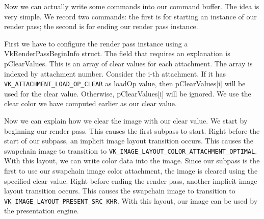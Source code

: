 \begin{minipage}{\linewidth}{\noindent}
    
\end{minipage}

Now we can actually write some commands into our command buffer.
The idea is very simple.
We record two commands: the first is for starting an instance of our render pass;
the second is for ending our render pass instance.

\begin{minipage}{\linewidth}{\noindent}
    
\end{minipage}

First we have to configure the render pass instance using a VkRenderPassBeginInfo
struct.
The field that requires an explanation is pClearValues.
This is an array of clear values for each attachment.
The array is indexed by attachment number.
Consider the i-th attachment.
If it has \texttt{VK\_ATTACHMENT\_LOAD\_OP\_CLEAR}
as loadOp value, then pClearValues[i] will be used for the clear value.
Otherwise, pClearValues[i] will be ignored.
We use the clear color we have computed earlier as our clear value.

\begin{minipage}{\linewidth}{\noindent}
    
\end{minipage}

Now we can explain how we clear the image with our clear value.
We start by beginning our render pass.
This causes the first subpass to start.
Right before the start of our subpass, an implicit image layout transition occurs.
This causes the swapchain image to transition to
\texttt{VK\_IMAGE\_LAYOUT\_COLOR\_ATTACHMENT\_OPTIMAL}.
With this layout, we can write color data into the image.
Since our subpass is the first to use our swapchain image color attachment, the image
is cleared using the specified clear value.
Right before ending the render pass, another implicit image layout transition occurs.
This causes the swapchain image to transition to
\texttt{VK\_IMAGE\_LAYOUT\_PRESENT\_SRC\_KHR}.
With this layout, our image can be used by the presentation engine.

